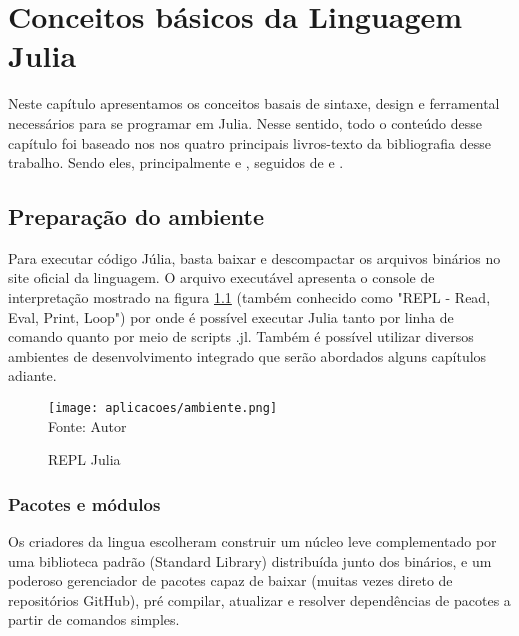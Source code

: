 %


\chapter{ Conceitos básicos da Linguagem Julia}


Neste capítulo apresentamos os conceitos basais de sintaxe, design e ferramental necessários para se programar em Julia. Nesse sentido, todo o conteúdo desse capítulo foi baseado nos  nos quatro principais livros-texto da bibliografia desse trabalho. Sendo eles, principalmente \cite{Lobianco2019} e \cite{Balbaert2016}, seguidos de \cite{Lauwens2019} e \cite{Kwong2020}.

\section{Preparação do ambiente}
Para executar código Júlia, basta baixar e descompactar os arquivos binários no site oficial da linguagem. O arquivo executável apresenta o console de interpretação mostrado na figura \ref{REPL} (também conhecido como "REPL - Read, Eval, Print, Loop") por onde é possível executar Julia tanto por linha de comando quanto por meio de scripts .jl. Também é possível utilizar diversos ambientes de desenvolvimento integrado que serão abordados alguns capítulos adiante.
\begin{figure}[H]
\begin{center}
    \caption{REPL Julia} \label{REPL}
    \texttt{[image: aplicacoes/ambiente.png]} \\
    {\tiny \sf Fonte: Autor}
\end{center}
\end{figure} 

\subsection{Pacotes e módulos}

Os criadores da lingua escolheram construir um núcleo leve complementado por uma biblioteca padrão (Standard Library) distribuída junto dos binários, e um poderoso gerenciador de pacotes capaz de baixar (muitas vezes direto de repositórios GitHub), pré compilar, atualizar e resolver dependências de pacotes a partir de comandos simples. 


